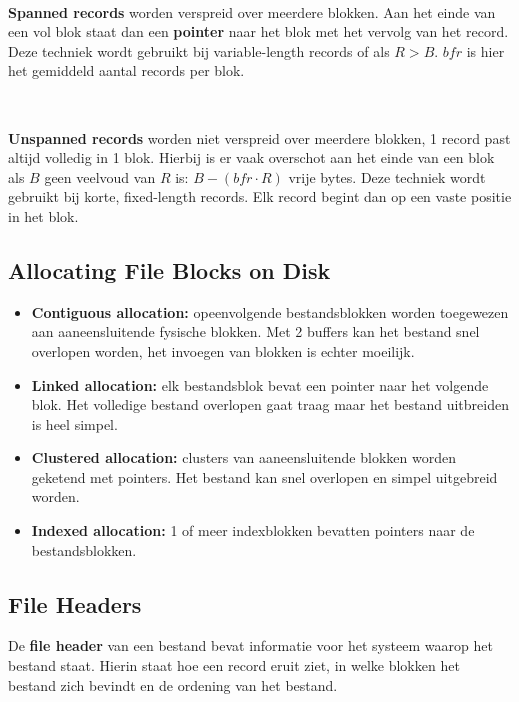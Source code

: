 ~

\noindent \textbf{Spanned records} worden verspreid over meerdere blokken. Aan het einde van een vol blok staat dan een \textbf{pointer} naar het blok met het vervolg van het record. Deze techniek wordt gebruikt bij variable-length records of als $R>B$. $\textit{bfr}$ is hier het gemiddeld aantal records per blok.

~

\noindent \textbf{Unspanned records} worden niet verspreid over meerdere blokken, 1 record past altijd volledig in 1 blok. Hierbij is er vaak overschot aan het einde van een blok als $B$ geen veelvoud van $R$ is: $B - (\textit{bfr} \cdot R)$ vrije bytes. Deze techniek wordt gebruikt bij korte, fixed-length records. Elk record begint dan op een vaste positie in het blok.


\subsection{Allocating File Blocks on Disk}
\begin{itemize}
\item \textbf{Contiguous allocation:} opeenvolgende bestandsblokken worden toegewezen aan aaneensluitende fysische blokken. Met 2 buffers kan het bestand snel overlopen worden, het invoegen van blokken is echter moeilijk.

\item \textbf{Linked allocation:} elk bestandsblok bevat een pointer naar het volgende blok. Het volledige bestand overlopen gaat traag maar het bestand uitbreiden is heel simpel.

\item \textbf{Clustered allocation:} clusters van aaneensluitende blokken worden geketend met pointers. Het bestand kan snel overlopen en simpel uitgebreid worden.
 
\item \textbf{Indexed allocation:} 1 of meer indexblokken bevatten pointers naar de bestandsblokken.
\end{itemize}


\subsection{File Headers}
De \textbf{file header} van een bestand bevat informatie voor het systeem waarop het bestand staat. Hierin staat hoe een record eruit ziet, in welke blokken het bestand zich bevindt en de ordening van het bestand.

